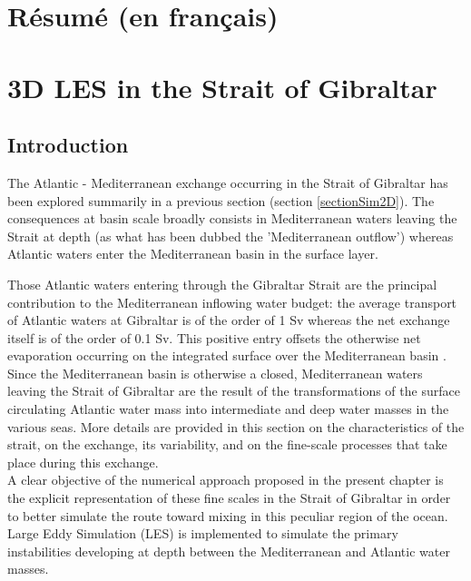 \hypersetup{pdfborder=0 0 0}

\section{Résumé (en français)}

\section{3D LES in the Strait of Gibraltar}
\label{sectionSim3D}
\subsection{Introduction}

The Atlantic - Mediterranean exchange occurring in the Strait of Gibraltar has been explored summarily in a previous section (section \ref{sectionSim2D}). The consequences at basin scale broadly consists in Mediterranean waters leaving the Strait at depth (as what has been dubbed the 'Mediterranean outflow') whereas Atlantic waters enter the Mediterranean basin in the surface layer.

Those Atlantic waters entering through the Gibraltar Strait are the principal contribution to the Mediterranean inflowing water budget: the average transport of Atlantic waters at Gibraltar is of the order of 1 Sv whereas the net exchange itself is of the order of 0.1 Sv. This positive entry offsets the otherwise net evaporation occurring on the integrated surface over the Mediterranean basin \citep{bryden_1994}.
Since the Mediterranean basin is otherwise a closed, Mediterranean waters leaving the Strait of Gibraltar are the result of the transformations of the surface circulating Atlantic water mass into intermediate and deep water masses in the various seas.
More details are provided in this section on the characteristics of the strait, on the exchange, its variability, and on the fine-scale processes that take place during this exchange.\\
A clear objective of the numerical approach proposed in the present chapter is the explicit representation of these fine scales in the Strait of Gibraltar in order to better simulate the route toward mixing in this peculiar region of the ocean. Large Eddy Simulation (LES) is implemented to simulate the primary instabilities developing at depth between the Mediterranean and Atlantic water masses.

